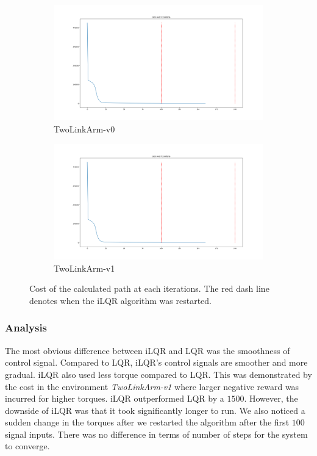\documentclass[hidelinks]{scrartcl}
\begin{document}
\begin{figure}[H]
	\centering
    \begin{subfigure}[b]{0.45\textwidth}
        \includegraphics[width=\textwidth]{figures/ilqr2-cost1}
        \caption{TwoLinkArm-v0}
    \end{subfigure}
    \begin{subfigure}[b]{0.45\textwidth}
        \includegraphics[width=\textwidth]{figures/ilqr2-cost2}
        \caption{TwoLinkArm-v1}
    \end{subfigure}
    \caption{Cost of the calculated path at each iterations. The red dash line denotes when the iLQR algorithm was restarted.}\label{fig:iLQR_cost}
\end{figure}
\subsubsection*{Analysis}
The most obvious difference between iLQR and LQR was the smoothness of control signal. Compared to LQR, iLQR's control signals are smoother and more gradual. iLQR also used less torque compared to LQR. This was demonstrated by the cost in the environment \textit{TwoLinkArm-v1} where larger negative reward was incurred for higher torques. iLQR outperformed LQR by a $1500$. However, the downside of iLQR was that it took significantly longer to run. We also noticed a sudden change in the torques after we restarted the algorithm after the first $100$ signal inputs. There was no difference in terms of number of steps for the system to converge.
\end{document}
